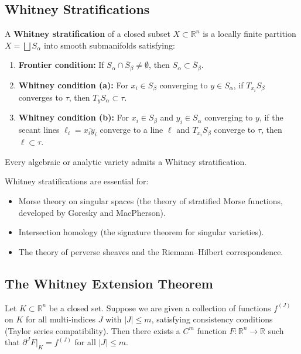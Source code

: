 \subsection{Whitney Stratifications}

\begin{definition}
A \textbf{Whitney stratification} of a closed subset $X \subset \mathbb{R}^n$ is a locally finite partition $X = \bigsqcup S_\alpha$ into smooth submanifolds satisfying:
\begin{enumerate}
    \item \textbf{Frontier condition:} If $S_\alpha \cap \bar S_\beta \neq \emptyset$, then $S_\alpha \subset \bar S_\beta$.
    \item \textbf{Whitney condition (a):} For $x_i \in S_\beta$ converging to $y \in S_\alpha$, if $T_{x_i}S_\beta$ converges to $\tau$, then $T_yS_\alpha \subset \tau$.
    \item \textbf{Whitney condition (b):} For $x_i \in S_\beta$ and $y_i \in S_\alpha$ converging to $y$, if the secant lines $\ell_i = \overline{x_i y_i}$ converge to a line $\ell$ and $T_{x_i}S_\beta$ converge to $\tau$, then $\ell \subset \tau$.
\end{enumerate}
\end{definition}

\begin{theorem}
Every algebraic or analytic variety admits a Whitney stratification.
\end{theorem}

Whitney stratifications are essential for:
\begin{itemize}
    \item Morse theory on singular spaces (the theory of stratified Morse functions, developed by Goresky and MacPherson).
    \item Intersection homology (the signature theorem for singular varieties).
    \item The theory of perverse sheaves and the Riemann--Hilbert correspondence.
\end{itemize}

\subsection{The Whitney Extension Theorem}

\begin{theorem}
Let $K \subset \mathbb{R}^n$ be a closed set. Suppose we are given a collection of functions $f^{(J)}$ on $K$ for all multi-indices $J$ with $|J| \leq m$, satisfying consistency conditions (Taylor series compatibility). Then there exists a $C^m$ function $F: \mathbb{R}^n \to \mathbb{R}$ such that $\partial^J F|_K = f^{(J)}$ for all $|J| \leq m$.
\end{theorem}

